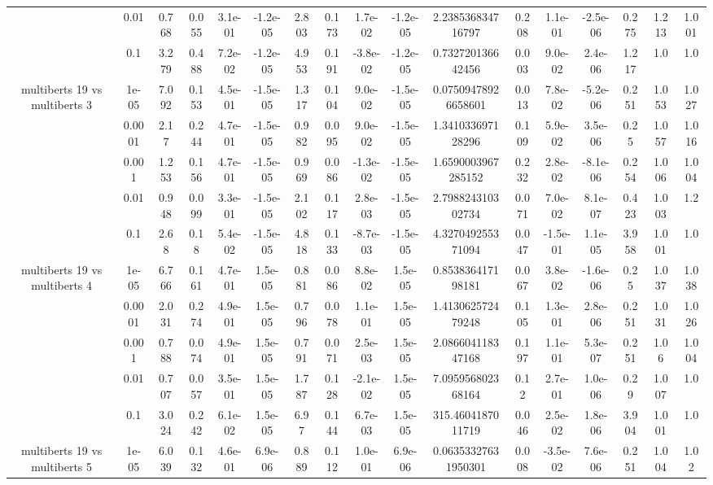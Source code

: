 \begin{tabular}{|c|c|c|c|c|c|c|c|c|c|c|c|c|c|c|c|c|}
 & 0.01 & 0.768 & 0.055 & 3.1e-01 & -1.2e-05 & 2.803 & 0.173 & 1.7e-02 & -1.2e-05 & 2.238536834716797 & 0.208 & 1.1e-01 & -2.5e-06 & 0.275 & 1.213 & 1.001 \\
 & 0.1 & 3.279 & 0.488 & 7.2e-02 & -1.2e-05 & 4.953 & 0.191 & -3.8e-02 & -1.2e-05 & 0.732720136642456 & 0.003 & 9.0e-02 & 2.4e-06 & 1.217 & 1.0 & 1.0 \\
\hline
\multirow{5}{*}{multiberts 19 vs multiberts 3} & 1e-05 & 7.092 & 0.153 & 4.5e-01 & -1.5e-05 & 1.317 & 0.104 & 9.0e-02 & -1.5e-05 & 0.07509478926658601 & 0.013 & 7.8e-02 & -5.2e-06 & 0.251 & 1.053 & 1.027 \\
 & 0.0001 & 2.17 & 0.244 & 4.7e-01 & -1.5e-05 & 0.982 & 0.095 & 9.0e-02 & -1.5e-05 & 1.341033697128296 & 0.109 & 5.9e-02 & 3.5e-06 & 0.25 & 1.057 & 1.016 \\
 & 0.001 & 1.253 & 0.156 & 4.7e-01 & -1.5e-05 & 0.969 & 0.086 & -1.3e-02 & -1.5e-05 & 1.6590003967285152 & 0.232 & 2.8e-02 & -8.1e-06 & 0.254 & 1.006 & 1.004 \\
 & 0.01 & 0.948 & 0.099 & 3.3e-01 & -1.5e-05 & 2.102 & 0.117 & 2.8e-03 & -1.5e-05 & 2.798824310302734 & 0.071 & 7.0e-02 & 8.1e-07 & 0.423 & 1.003 & 1.2 \\
 & 0.1 & 2.68 & 0.18 & 5.4e-02 & -1.5e-05 & 4.818 & 0.133 & -8.7e-03 & -1.5e-05 & 4.327049255371094 & 0.047 & -1.5e-01 & 1.1e-05 & 3.958 & 1.001 & 1.0 \\
\hline
\multirow{5}{*}{multiberts 19 vs multiberts 4} & 1e-05 & 6.766 & 0.161 & 4.7e-01 & 1.5e-05 & 0.881 & 0.086 & 8.8e-02 & 1.5e-05 & 0.853836417198181 & 0.067 & 3.8e-02 & -1.6e-06 & 0.25 & 1.037 & 1.038 \\
 & 0.0001 & 2.031 & 0.274 & 4.9e-01 & 1.5e-05 & 0.796 & 0.078 & 1.1e-01 & 1.5e-05 & 1.413062572479248 & 0.105 & 1.3e-01 & 2.8e-06 & 0.251 & 1.031 & 1.026 \\
 & 0.001 & 0.788 & 0.074 & 4.9e-01 & 1.5e-05 & 0.791 & 0.071 & 2.5e-03 & 1.5e-05 & 2.086604118347168 & 0.197 & 1.1e-01 & 5.3e-07 & 0.251 & 1.06 & 1.004 \\
 & 0.01 & 0.707 & 0.057 & 3.5e-01 & 1.5e-05 & 1.787 & 0.128 & -2.1e-02 & 1.5e-05 & 7.095956802368164 & 0.12 & 2.7e-01 & 1.0e-06 & 0.29 & 1.007 & 1.0 \\
 & 0.1 & 3.024 & 0.242 & 6.1e-02 & 1.5e-05 & 6.97 & 0.144 & 6.7e-03 & 1.5e-05 & 315.4604187011719 & 0.046 & 2.5e-02 & 1.8e-06 & 3.904 & 1.001 & 1.0 \\
\hline
\multirow{5}{*}{multiberts 19 vs multiberts 5} & 1e-05 & 6.039 & 0.132 & 4.6e-01 & 6.9e-06 & 0.889 & 0.112 & 1.0e-01 & 6.9e-06 & 0.06353327631950301 & 0.008 & -3.5e-02 & 7.6e-06 & 0.251 & 1.004 & 1.02 \\

\end{tabular}
